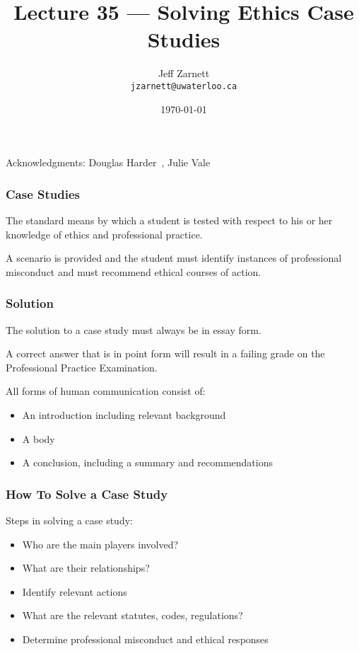 

\title{Lecture 35 --- Solving Ethics Case Studies }

\author{Jeff Zarnett \\ \small \texttt{jzarnett@uwaterloo.ca}}
\date{\today}




\begin{frame}
  \titlepage

\begin{center}
  \small{Acknowledgments: Douglas Harder~\cite{dwh}, Julie Vale~\cite{jv}}
  \end{center}
\end{frame}



\begin{frame}
\frametitle{Case Studies}

The standard means by which a student is tested with respect to his or her knowledge of ethics and professional practice.

A scenario is provided and the student must identify instances of professional misconduct and must recommend ethical courses of action.

\end{frame}



\begin{frame}
\frametitle{Solution}

The solution to a case study must always be in essay form.

A correct answer that is in point form will result in a failing grade on the Professional Practice Examination.

All forms of human communication consist of:
\begin{itemize}
	\item An introduction including relevant background
	\item A body
	\item A conclusion, including a summary and recommendations
\end{itemize}

\end{frame}



\begin{frame}
\frametitle{How To Solve a Case Study}

Steps in solving a case study:

\begin{itemize}
	\item Who are the main players involved?
	\item What are their relationships?
	\item Identify relevant actions
	\item What are the relevant statutes, codes, regulations?
	\item Determine professional misconduct and ethical responses
\end{itemize}


\end{frame}



